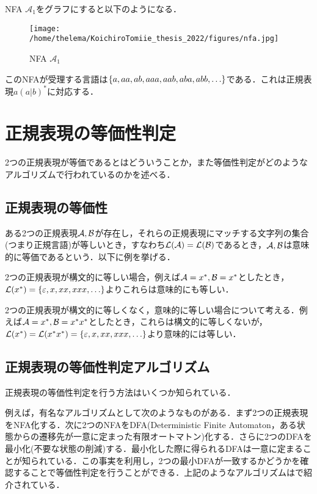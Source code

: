 \documentclass[a4paper, 12pt, dvipdfmx, uplatex]{jsreport}
\begin{document}
NFA $\mathcal{A}_1$をグラフにすると以下のようになる．
\begin{figure}[H] %
  \centering
  \texttt{[image: /home/thelema/KoichiroTomiie\_thesis\_2022/figures/nfa.jpg]}
  \caption{NFA $\mathcal{A}_1$\label{nfa_example}}
\end{figure}

このNFAが受理する言語は$\qty{a,aa,ab,aaa,aab,aba,abb,\ldots}$である．これは正規表現$a(a|b)^*$に対応する．


\section{正規表現の等価性判定}
2つの正規表現が等価であるとはどういうことか，また等価性判定がどのようなアルゴリズムで行われているのかを述べる．

\subsection{正規表現の等価性}
ある2つの正規表現$\mathcal{A},\mathcal{B}$が存在し，それらの正規表現にマッチする文字列の集合(つまり正規言語)が等しいとき，すなわち$\mathcal{L(A)}=\mathcal{L(B)}$であるとき，$\mathcal{A},\mathcal{B}$は意味的に等価であるという．以下に例を挙げる．

2つの正規表現が構文的に等しい場合，例えば$\mathcal{A}=x^*,\mathcal{B}=x^*$としたとき，$\mathcal{L}(x^*)=\qty{\varepsilon,x,xx,xxx,\ldots}$よりこれらは意味的にも等しい．

2つの正規表現が構文的に等しくなく，意味的に等しい場合について考える．例えば$\mathcal{A}=x^*,\mathcal{B}=x^*x^*$としたとき，これらは構文的に等しくないが，$\mathcal{L}(x^*)=\mathcal{L}(x^*x^*)=\qty{\varepsilon,x,xx,xxx,\ldots}$より意味的には等しい．

\subsection{正規表現の等価性判定アルゴリズム}\label{eq_check}
正規表現の等価性判定を行う方法はいくつか知られている．

例えば，有名なアルゴリズムとして次のようなものがある．まず2つの正規表現をNFA化する．次に2つのNFAをDFA(Deterministic Finite Automaton，ある状態からの遷移先が一意に定まった有限オートマトン)化する．さらに2つのDFAを最小化(不要な状態の削減)する．最小化した際に得られるDFAは一意に定まることが知られている．この事実を利用し，2つの最小DFAが一致するかどうかを確認することで等価性判定を行うことができる．上記のようなアルゴリズムは\cite{hopcroft}で紹介されている．
\end{document}

